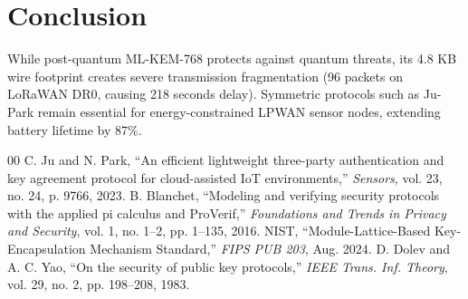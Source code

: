\documentclass[journal,10pt,twocolumn]{IEEEtran}
\begin{document}
\section{Conclusion}
While post-quantum ML-KEM-768 protects against quantum threats, its 4.8 KB wire footprint creates severe transmission fragmentation (96 packets on LoRaWAN DR0, causing 218 seconds delay). Symmetric protocols such as Ju-Park remain essential for energy-constrained LPWAN sensor nodes, extending battery lifetime by 87\%.

\begin{thebibliography}{00}
 C. Ju and N. Park, ``An efficient lightweight three-party authentication and key agreement protocol for cloud-assisted IoT environments,'' \emph{Sensors}, vol. 23, no. 24, p. 9766, 2023.
 B. Blanchet, ``Modeling and verifying security protocols with the applied pi calculus and ProVerif,'' \emph{Foundations and Trends in Privacy and Security}, vol. 1, no. 1--2, pp. 1--135, 2016.
 NIST, ``Module-Lattice-Based Key-Encapsulation Mechanism Standard,'' \emph{FIPS PUB 203}, Aug. 2024.
 D. Dolev and A. C. Yao, ``On the security of public key protocols,'' \emph{IEEE Trans. Inf. Theory}, vol. 29, no. 2, pp. 198--208, 1983.
\end{thebibliography}
\end{document}
